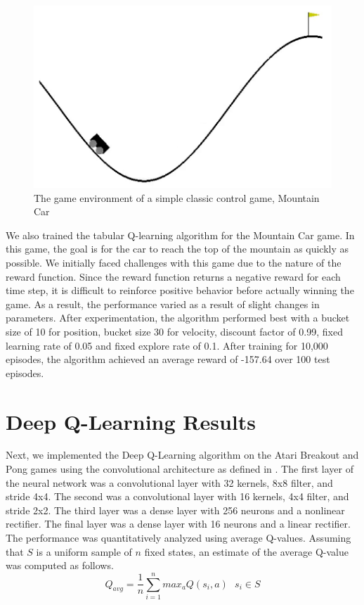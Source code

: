 \begin{figure}[h!]
\centering\includegraphics[scale=0.45,clip]{Graphics/mountain_car.png}
\caption[Mountain Car]{The game environment of a simple classic control game, Mountain Car}
\label{fig:mountain_car}
\end{figure}

We also trained the tabular Q-learning algorithm for the Mountain Car game. In this game, the goal is for the car to reach the top of the mountain as quickly as possible. We initially faced challenges with this game due to the nature of the reward function. Since the reward function returns a negative reward for each time step, it is difficult to reinforce positive behavior before actually winning the game. As a result, the performance varied as a result of slight changes in parameters. After experimentation, the algorithm performed best with a bucket size of 10 for position, bucket size 30 for velocity, discount factor of 0.99, fixed learning rate of 0.05 and fixed explore rate of 0.1. After training for 10,000 episodes, the algorithm achieved an average reward of -157.64 over 100 test episodes.

\section{Deep Q-Learning Results}\label{sec:deepQ}
Next, we implemented the Deep Q-Learning algorithm on the Atari Breakout and Pong games using the convolutional architecture as defined in \cite{mnih2013playing}. The first layer of the neural network was a convolutional layer with 32 kernels, 8x8 filter, and stride 4x4. The second was a convolutional layer with 16 kernels, 4x4 filter, and stride 2x2. The third layer was a dense layer with 256 neurons and a nonlinear rectifier. The final layer was a dense layer with 16 neurons and a linear rectifier. The performance was quantitatively analyzed using average Q-values. Assuming that $S$ is a uniform sample of $n$ fixed states, an estimate of the average Q-value was computed as follows.
$$ Q_{avg} = \frac{1}{n} \sum_{i=1}^{n} max_{a} Q(s_{i},a) ~~~ s_{i} \in S$$

